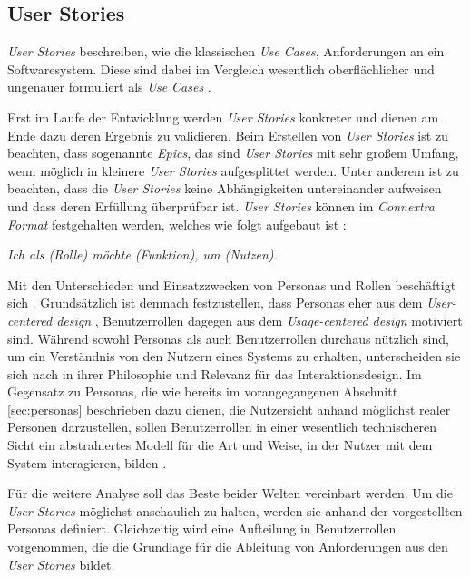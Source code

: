\subsection{User Stories}
\textit{User Stories} beschreiben, wie die klassischen \textit{Use Cases}, Anforderungen an ein Softwaresystem. Diese sind dabei im Vergleich wesentlich oberflächlicher und ungenauer formuliert als \textit{Use Cases} \citep{wirdemann2017scrum}.

Erst im Laufe der Entwicklung werden \textit{User Stories} konkreter und dienen am Ende dazu deren Ergebnis zu validieren. Beim Erstellen von \textit{User Stories} ist zu beachten, dass sogenannte \textit{Epics}, das sind \textit{User Stories} mit sehr großem Umfang, wenn möglich in kleinere \textit{User Stories} aufgesplittet werden. Unter anderem ist zu beachten, dass die \textit{User Stories} keine Abhängigkeiten untereinander aufweisen und dass deren Erfüllung überprüfbar ist. \textit{User Stories} können im \textit{Connextra Format} festgehalten werden, welches wie folgt aufgebaut ist \citep{cohn2004user}:

\par
\begingroup
\leftskip=1cm
\rightskip=1.5cm
\noindent

\textit{Ich als (Rolle) möchte (Funktion), um (Nutzen).}

\par
\endgroup

\vspace{.3cm}

Mit den Unterschieden und Einsatzzwecken von Personas und Rollen beschäftigt sich \cite{constantine2006users}. Grundsätzlich ist demnach festzustellen, dass Personas eher aus dem \textit{User-centered design} \citep{Norman1986user}, Benutzerrollen dagegen aus dem \textit{Usage-centered design} \citep{Constantine1996usage} motiviert sind. Während sowohl Personas als auch Benutzerrollen durchaus nützlich sind, um ein Verständnis von den Nutzern eines Systems zu erhalten, unterscheiden sie sich nach \cite{constantine2006users} in ihrer Philosophie und Relevanz für das Interaktionsdesign. Im Gegensatz zu Personas, die wie bereits im vorangegangenen Abschnitt \ref{sec:personas} beschrieben dazu dienen, die Nutzersicht anhand möglichst realer Personen darzustellen, sollen Benutzerrollen in einer wesentlich technischeren Sicht ein abstrahiertes Modell für die Art und Weise, in der Nutzer mit dem System interagieren, bilden \citep{constantine2006users}.

Für die weitere Analyse soll das Beste beider Welten vereinbart werden. Um die \textit{User Stories} möglichst anschaulich zu halten, werden sie anhand der vorgestellten Personas definiert. Gleichzeitig wird eine Aufteilung in Benutzerrollen vorgenommen, die die Grundlage für die Ableitung von Anforderungen aus den \textit{User Stories} bildet.

